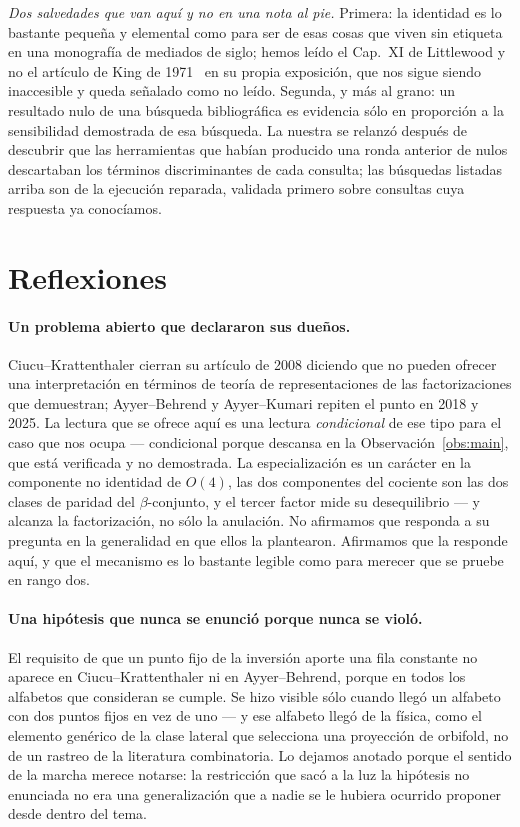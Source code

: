 \documentclass[11pt,a4paper]{article}
\begin{document}
\emph{Dos salvedades que van aqu\'i y no en una nota al pie.} Primera: la identidad es lo
bastante peque\~na y elemental como para ser de esas cosas que viven sin etiqueta en una
monograf\'ia de mediados de siglo; hemos le\'ido el Cap.~XI de Littlewood y no el art\'iculo de
King de 1971~\cite{King71} en su propia exposici\'on, que nos sigue siendo inaccesible y queda
se\~nalado como no le\'ido. Segunda, y m\'as al grano: un resultado nulo de una b\'usqueda
bibliogr\'afica es evidencia s\'olo en proporci\'on a la sensibilidad demostrada de esa
b\'usqueda. La nuestra se relanz\'o despu\'es de descubrir que las herramientas que hab\'ian
producido una ronda anterior de nulos descartaban los t\'erminos discriminantes de cada
consulta; las b\'usquedas listadas arriba son de la ejecuci\'on reparada, validada primero
sobre consultas cuya respuesta ya conoc\'iamos.

\section{Reflexiones}\label{sec:reflections}

\paragraph{Un problema abierto que declararon sus due\~nos.} Ciucu--Krattenthaler cierran su
art\'iculo de 2008 diciendo que no pueden ofrecer una interpretaci\'on en t\'erminos de
teor\'ia de representaciones de las factorizaciones que demuestran; Ayyer--Behrend y
Ayyer--Kumari repiten el punto en 2018 y 2025. La lectura que se ofrece aqu\'i es una lectura \emph{condicional} de ese tipo
para el caso que nos ocupa --- condicional porque descansa en la Observaci\'on~\ref{obs:main},
que est\'a verificada y no demostrada. La especializaci\'on es un car\'acter en la componente no
identidad de $O(4)$, las dos componentes del cociente son las dos clases de paridad del
$\beta$-conjunto, y el tercer factor mide su desequilibrio --- y alcanza la factorizaci\'on, no
s\'olo la anulaci\'on. No afirmamos que responda a su pregunta en la generalidad en que ellos
la plantearon. Afirmamos que la responde aqu\'i, y que el mecanismo es lo bastante legible como
para merecer que se pruebe en rango dos.

\paragraph{Una hip\'otesis que nunca se enunci\'o porque nunca se viol\'o.} El requisito de que
un punto fijo de la inversi\'on aporte una fila constante no aparece en Ciucu--Krattenthaler ni
en Ayyer--Behrend, porque en todos los alfabetos que consideran se cumple. Se hizo visible
s\'olo cuando lleg\'o un alfabeto con dos puntos fijos en vez de uno --- y ese alfabeto lleg\'o
de la f\'isica, como el elemento gen\'erico de la clase lateral que selecciona una proyecci\'on
de orbifold, no de un rastreo de la literatura combinatoria. Lo dejamos anotado porque el
sentido de la marcha merece notarse: la restricci\'on que sac\'o a la luz la hip\'otesis no enunciada
no era una generalizaci\'on que a nadie se le hubiera ocurrido proponer desde dentro del
tema.
\end{document}
